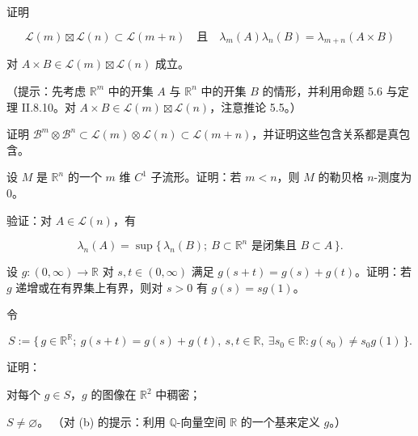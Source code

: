 \exerciseshead

\begin{exercises}
\item

证明

\[
\mathcal{L}(m) \boxtimes \mathcal{L}(n) \subset \mathcal{L}(m+n) \quad \text{且} \quad \lambda_m(A)\lambda_n(B) = \lambda_{m+n}(A \times B)
\]

对 $ A \times B \in \mathcal{L}(m) \boxtimes \mathcal{L}(n) $ 成立。

（提示：先考虑 $ \mathbb{R}^m $ 中的开集 $ A $ 与 $ \mathbb{R}^n $ 中的开集 $ B $ 的情形，并利用命题 5.6 与定理 II.8.10。对 $ A \times B \in \mathcal{L}(m) \boxtimes \mathcal{L}(n) $，注意推论 5.5。）

\item

证明 $ \mathcal{B}^m \otimes \mathcal{B}^n \subset \mathcal{L}(m) \otimes \mathcal{L}(n) \subset \mathcal{L}(m+n) $，并证明这些包含关系都是真包含。

\item

设 $ M $ 是 $ \mathbb{R}^n $ 的一个 $ m $ 维 $ C^1 $ 子流形。证明：若 $ m < n $，则 $ M $ 的勒贝格 $ n $-测度为 0。

\item

验证：对 $ A \in \mathcal{L}(n) $，有

\[
\lambda_n(A) = \sup\{\, \lambda_n(B) ;\ B \subset \mathbb{R}^n \text{ 是闭集且 } B \subset A \,\} .
\]
\item

设 $ g : (0,\infty) \to \mathbb{R} $ 对 $ s,t \in (0,\infty) $ 满足 $ g(s+t) = g(s) + g(t) $。证明：若 $ g $ 递增或在有界集上有界，则对 $ s > 0 $ 有 $ g(s) = sg(1) $。

\item

令

\[
S := \{\, g \in \mathbb{R}^{\mathbb{R}} ;\ g(s+t) = g(s) + g(t),\ s,t \in \mathbb{R},\ \exists s_0 \in \mathbb{R} : g(s_0) \ne s_0 g(1) \,\} .
\]

证明：

\begin{items}
\item

对每个 $ g \in S $，$ g $ 的图像在 $ \mathbb{R}^2 $ 中稠密；

\item

$ S \ne \varnothing $。
（对 (b) 的提示：利用 $ \mathbb{Q} $-向量空间 $ \mathbb{R} $ 的一个基来定义 $ g $。）


\end{items}
\end{exercises}
